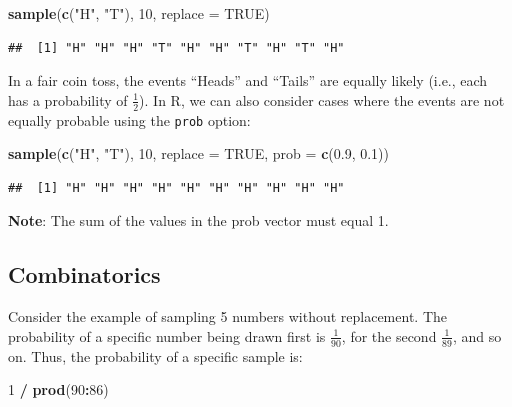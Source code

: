 \documentclass[
]{article}
\newenvironment{Shaded}{\begin{snugshade}}{\end{snugshade}}
\newcommand{\AttributeTok}[1]{\textcolor[rgb]{0.13,0.29,0.53}{#1}}
\newcommand{\ConstantTok}[1]{\textcolor[rgb]{0.56,0.35,0.01}{#1}}
\newcommand{\DecValTok}[1]{\textcolor[rgb]{0.00,0.00,0.81}{#1}}
\newcommand{\FloatTok}[1]{\textcolor[rgb]{0.00,0.00,0.81}{#1}}
\newcommand{\FunctionTok}[1]{\textcolor[rgb]{0.13,0.29,0.53}{\textbf{#1}}}
\newcommand{\NormalTok}[1]{#1}
\newcommand{\SpecialCharTok}[1]{\textcolor[rgb]{0.81,0.36,0.00}{\textbf{#1}}}
\newcommand{\StringTok}[1]{\textcolor[rgb]{0.31,0.60,0.02}{#1}}
\begin{document}
\begin{Shaded}
\begin{Highlighting}[]
\FunctionTok{sample}\NormalTok{(}\FunctionTok{c}\NormalTok{(}\StringTok{"H"}\NormalTok{, }\StringTok{"T"}\NormalTok{), }\DecValTok{10}\NormalTok{, }\AttributeTok{replace =} \ConstantTok{TRUE}\NormalTok{)}
\end{Highlighting}
\end{Shaded}

\begin{verbatim}
##  [1] "H" "H" "H" "T" "H" "H" "T" "H" "T" "H"
\end{verbatim}

In a fair coin toss, the events ``Heads'' and ``Tails'' are equally
likely (i.e., each has a probability of \(\frac{1}{2}\)). In R, we can
also consider cases where the events are not equally probable using the
\texttt{prob} option:

\begin{Shaded}
\begin{Highlighting}[]
\FunctionTok{sample}\NormalTok{(}\FunctionTok{c}\NormalTok{(}\StringTok{"H"}\NormalTok{, }\StringTok{"T"}\NormalTok{), }\DecValTok{10}\NormalTok{, }\AttributeTok{replace =} \ConstantTok{TRUE}\NormalTok{, }\AttributeTok{prob =} \FunctionTok{c}\NormalTok{(}\FloatTok{0.9}\NormalTok{, }\FloatTok{0.1}\NormalTok{))}
\end{Highlighting}
\end{Shaded}

\begin{verbatim}
##  [1] "H" "H" "H" "H" "H" "H" "H" "H" "H" "H"
\end{verbatim}

\textbf{Note}: The sum of the values in the prob vector must equal 1.

\hypertarget{combinatorics}{%
\subsection{Combinatorics}\label{combinatorics}}

Consider the example of sampling 5 numbers without replacement. The
probability of a specific number being drawn first is \(\frac{1}{90}\),
for the second \(\frac{1}{89}\), and so on. Thus, the probability of a
specific sample is:

\begin{Shaded}
\begin{Highlighting}[]
\DecValTok{1} \SpecialCharTok{/} \FunctionTok{prod}\NormalTok{(}\DecValTok{90}\SpecialCharTok{:}\DecValTok{86}\NormalTok{)}
\end{Highlighting}
\end{Shaded}
\end{document}
